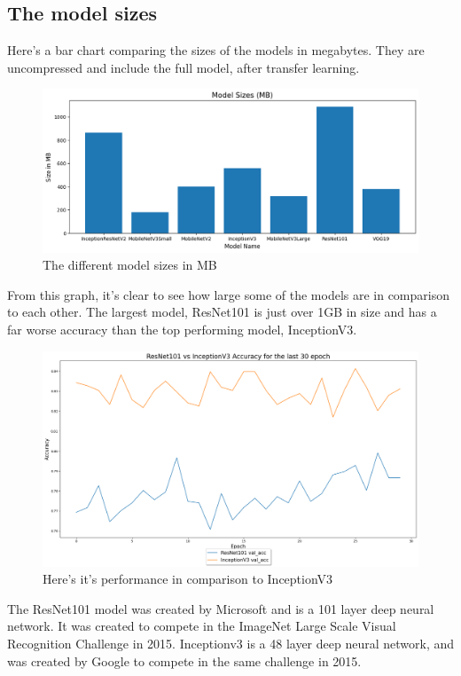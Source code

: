 \documentclass[]{final_report}
\begin{document}
\pagebreak
\subsection{The model sizes}

Here's a bar chart comparing the sizes of the models in megabytes. 
They are uncompressed and include the full model, after transfer learning.

\begin{figure}[ht!]
  \centering
  \includegraphics[width=120mm]{images/model-sizes.png}
  \caption{The different model sizes in MB}
\end{figure}

From this graph, it's clear to see how large some of the models are in comparison to each other.
The largest model, ResNet101 is just over 1GB in size and has a far worse accuracy than the top performing model, InceptionV3.

\begin{figure}[ht!]
  \centering
  \includegraphics[width=120mm]{images/ResNet101-vs-Inceptionv3.png}
  \caption{Here's it's performance in comparison to InceptionV3}
\end{figure}

The ResNet101\cite{DBLP:journals/corr/HeZRS15} model was created by Microsoft and is a 101 layer deep neural network.
It was created to compete in the ImageNet Large Scale Visual Recognition Challenge\cite{ILSVRC} in 2015.
Inceptionv3 is a 48 layer deep neural network, and was created by Google to compete in the same challenge in 2015.
\end{document}
